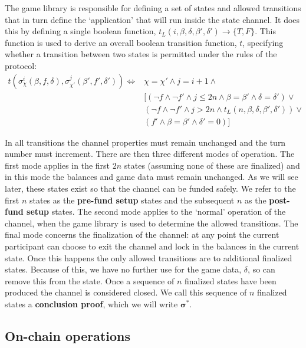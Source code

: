The game library is responsible for defining a set of states and allowed transitions that
in turn define the `application' that will run inside the state channel. It does this by
defining a single boolean function, $t_L(i, \beta, \delta, \beta', \delta') \rightarrow \{ T, F\}$.
This function is used to derive an overall boolean transition function, $t$, specifying whether
a transition between two states is permitted under the rules of the protocol:
\begin{align*}
  t(\sigma_\chi^i(\beta, f, \delta), \sigma_{\chi'}^j(\beta', f', \delta') ) \Leftrightarrow &
    \chi = \chi'
    \wedge j = i + 1
    \wedge \\
    & [ (\neg f \wedge \neg f' \wedge j \leq 2n \wedge \beta = \beta' \wedge \delta = \delta') \vee \\
    & (\neg f \wedge \neg f' \wedge j > 2n \wedge t_L(n, \beta, \delta, \beta', \delta')) \vee \\
    & (f' \wedge \beta = \beta' \wedge \delta' = 0) ]
\end{align*}

In all transitions the channel properties must remain unchanged and the turn number must increment.
There are then three different modes of operation. The first mode applies in the first $2n$
states (assuming none of these are finalized) and in this mode the balances and game data
must remain unchanged. As we will see later, these states exist so that the channel can be
funded safely. We refer to the first $n$ states as the \textbf{pre-fund setup} states and
the subsequent $n$ as the \textbf{post-fund setup} states. The second mode applies to the
`normal' operation of the channel, when the game library is used to determine the allowed
transitions. The final mode concerns the finalization of the channel: at any point the current
participant can choose to exit the channel and lock in the balances in the current state.
Once this happens the only allowed transitions are to additional finalized states. Because
of this, we have no further use for the game data, $\delta$, so can remove this from the state.
Once a sequence of $n$ finalized states have been produced the channel is considered closed. We
call this sequence of $n$ finalized states a \textbf{conclusion proof}, which we will write $\bm{\sigma}^*$.



\subsection{On-chain operations}

